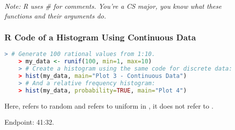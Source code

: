 \documentclass[../Notes.tex]{subfiles}
\begin{document}
\emph{Note: R uses \# for comments. You're a CS major, you know what these functions and their arguments do.}

\subsubsection{R Code of a Histogram Using Continuous Data}

\begin{lstlisting}[language=R]
    > # Generate 100 rational values from 1:10.
    > my_data <- runif(100, min=1, max=10)
    > # Create a histogram using the same code for discrete data:
    > hist(my_data, main="Plot 3 - Continuous Data")
    > # And a relative frequency histogram:
    > hist(my_data, probability=TRUE, main="Plot 4")
\end{lstlisting}

Here,  refers to random and  refers to uniform in , it does not refer to  .

Endpoint: 41:32.
\end{document}
